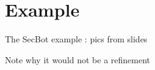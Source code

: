 
\section{Example}
\label{sec:example}
The SecBot example : pics from slides

Note why it would not be a refinement 